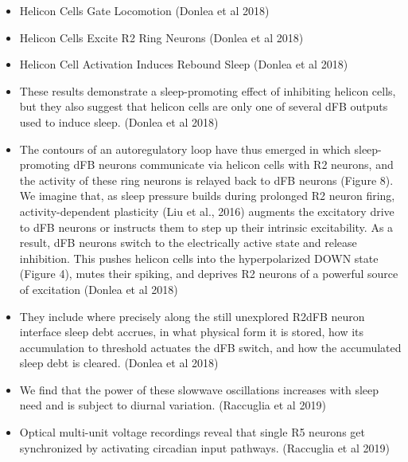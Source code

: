 \documentclass[11pt]{article}
\begin{document}
\begin{itemize}
    \item Helicon Cells Gate Locomotion
    \cite{donleaRecurrentCircuitryBalancing2018} (Donlea et al 2018)

    \item Helicon Cells Excite R2 Ring Neurons
    \cite{donleaRecurrentCircuitryBalancing2018} (Donlea et al 2018)

    \item Helicon Cell Activation Induces Rebound Sleep
    \cite{donleaRecurrentCircuitryBalancing2018} (Donlea et al 2018)

    \item These results demonstrate a sleep-promoting effect of inhibiting helicon cells, but they also suggest that helicon cells are only one of several dFB outputs used to induce sleep.
    \cite{donleaRecurrentCircuitryBalancing2018} (Donlea et al 2018)

    \item The contours of an autoregulatory loop have thus emerged in which sleep-promoting dFB neurons communicate via helicon cells with R2 neurons, and the activity of these ring neurons is relayed back to dFB neurons (Figure 8). We imagine that, as sleep pressure builds during prolonged R2 neuron firing, activity-dependent plasticity (Liu et al., 2016) augments the excitatory drive to dFB neurons or instructs them to step up their intrinsic excitability. As a result, dFB neurons switch to the electrically active state and release inhibition. This pushes helicon cells into the hyperpolarized DOWN state (Figure 4), mutes their spiking, and deprives R2 neurons of a powerful source of excitation
    \cite{donleaRecurrentCircuitryBalancing2018} (Donlea et al 2018)

    \item They include where precisely along the still unexplored R2dFB neuron interface sleep debt accrues, in what physical form it is stored, how its accumulation to threshold actuates the dFB switch, and how the accumulated sleep debt is cleared.
    \cite{donleaRecurrentCircuitryBalancing2018} (Donlea et al 2018)

    \item We find that the power of these slowwave oscillations increases with sleep need and is subject to diurnal variation.
    \cite{raccugliaNetworkSpecificSynchronizationElectrical2019} (Raccuglia et al 2019)
    
    \item Optical multi-unit voltage recordings reveal that single R5 neurons get synchronized by activating circadian input pathways.
    \cite{raccugliaNetworkSpecificSynchronizationElectrical2019} (Raccuglia et al 2019)


\end{itemize}
\end{document}
